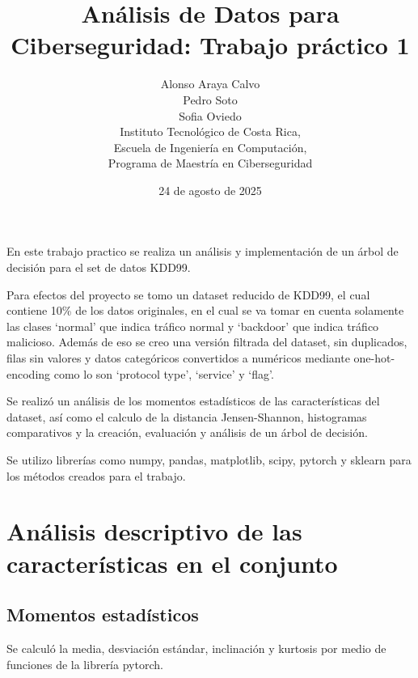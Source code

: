 \documentclass[12pt,a4paper]{article}
\begin{document}
\title{Análisis de Datos para Ciberseguridad: Trabajo práctico 1}

\author{
  Alonso Araya Calvo \\
  Pedro Soto \\
  Sofia Oviedo \\
  Instituto Tecnológico de Costa Rica, \\
  Escuela de Ingeniería en Computación, \\
  Programa de Maestría en Ciberseguridad
}

\date{ 24 de agosto de 2025 }
\maketitle

En este trabajo practico se realiza un análisis y implementación de un árbol de decisión para el set de datos KDD99.

Para efectos del proyecto se tomo un dataset reducido de KDD99, el cual contiene 10\% de los datos originales,
en el cual se va tomar en cuenta solamente las clases `normal' que indica tráfico normal y `backdoor' que indica tráfico malicioso.
Además de eso se creo una versión filtrada del dataset, sin duplicados, filas sin valores y datos categóricos convertidos a
numéricos mediante one-hot-encoding como lo son `protocol type', `service' y `flag'.

Se realizó un análisis de los momentos estadísticos de las características del dataset, así como el calculo de la distancia Jensen-Shannon,
histogramas comparativos y la creación, evaluación y análisis de un árbol de decisión.

Se utilizo librerías como numpy, pandas, matplotlib, scipy, pytorch y sklearn para los métodos creados para el trabajo.

\section{Análisis descriptivo de las características en el conjunto}\label{sec:analisis-descriptivo-de-las-caracteristicas-en-el-conjunto}

\subsection{Momentos estadísticos}\label{subsec:momentos-estadisticos}

Se calculó la media, desviación estándar, inclinación y kurtosis por medio de funciones de la librería pytorch.
\end{document}
